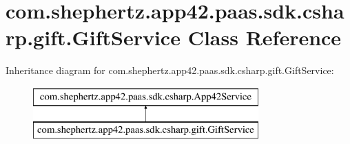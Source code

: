 \hypertarget{classcom_1_1shephertz_1_1app42_1_1paas_1_1sdk_1_1csharp_1_1gift_1_1_gift_service}{\section{com.\+shephertz.\+app42.\+paas.\+sdk.\+csharp.\+gift.\+Gift\+Service Class Reference}
\label{classcom_1_1shephertz_1_1app42_1_1paas_1_1sdk_1_1csharp_1_1gift_1_1_gift_service}
}
Inheritance diagram for com.\+shephertz.\+app42.\+paas.\+sdk.\+csharp.\+gift.\+Gift\+Service\+:\begin{figure}[H]
\begin{center}
\leavevmode
\includegraphics[height=2.000000cm]{classcom_1_1shephertz_1_1app42_1_1paas_1_1sdk_1_1csharp_1_1gift_1_1_gift_service}
\end{center}
\end{figure}
